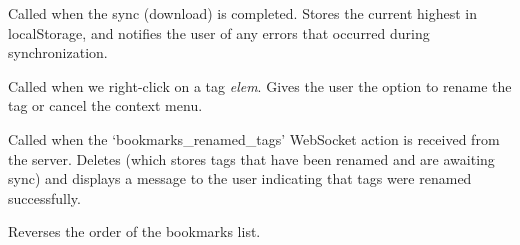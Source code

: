 \documentclass[letterpaper,10pt,openany]{sphinxmanual}
\begin{document}

\begin{fulllineitems}
\label{Applications/terminal/plugin_bookmarks:GateOne.Bookmarks.syncComplete}
Called when the sync (download) is completed.  Stores the current highest  in localStorage, and notifies the user of any errors that occurred during synchronization.

\end{fulllineitems}


\begin{fulllineitems}
\label{Applications/terminal/plugin_bookmarks:GateOne.Bookmarks.tagContextMenu}
Called when we right-click on a tag \emph{elem}.  Gives the user the option to rename the tag or cancel the context menu.

\end{fulllineitems}


\begin{fulllineitems}
\label{Applications/terminal/plugin_bookmarks:GateOne.Bookmarks.tagRenameComplete}
Called when the `bookmarks\_renamed\_tags' WebSocket action is received from the server.  Deletes  (which stores tags that have been renamed and are awaiting sync) and displays a message to the user indicating that tags were renamed successfully.

\end{fulllineitems}


\begin{fulllineitems}
\label{Applications/terminal/plugin_bookmarks:GateOne.Bookmarks.toggleSortOrder}
Reverses the order of the bookmarks list.

\end{fulllineitems}
\end{document}
